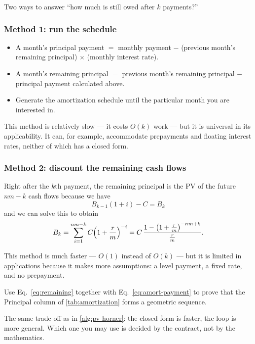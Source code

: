 
Two ways to answer ``how much is still owed after $k$ payments?''

\subsubsection*{Method 1: run the schedule}

\begin{itemize}[nosep]
	\item A month's principal payment $=$ monthly payment $-$ (previous month's remaining principal) $\times$ (monthly interest rate).
	\item A month's remaining principal $=$ previous month's remaining principal $-$ principal payment calculated above.
	\item Generate the amortization schedule until the particular month you are interested in.
\end{itemize}

This method is relatively slow --- it costs $O(k)$ work --- but it is universal in its applicability.
It can, for example, accommodate prepayments and floating interest rates, neither of which has a closed form.

\subsubsection*{Method 2: discount the remaining cash flows}

Right after the $k$th payment, the remaining principal is the PV of the future $nm-k$ cash flows because we have
\[
    B_{k - 1} (1 + i) - C = B_k
\]
and we can solve this to obtain
\begin{equation}
	B_k = \sum_{i=1}^{nm-k} C\Bigl(1+\frac{r}{m}\Bigr)^{-i}
	= C\,\frac{1-\bigl(1+\frac{r}{m}\bigr)^{-nm+k}}{\frac{r}{m}} .
	\label{eq:remaining}
\end{equation}


This method is much faster --- $O(1)$ instead of $O(k)$ --- but it is limited in applications because it makes more assumptions: a level payment, a fixed rate, and no prepayment.

\begin{exercise}
	Use Eq.~\eqref{eq:remaining} together with Eq.~\eqref{eq:amort-payment} to prove that the \textsf{Principal} column of \autoref{tab:amortization} forms a geometric sequence.
\end{exercise}

\suppstart
\begin{moral}
	The same trade-off as in \autoref{alg:pv-horner}: the closed form is faster, the loop is more general. Which one you may use is decided by the contract, not by the mathematics.
\end{moral}
\suppend

